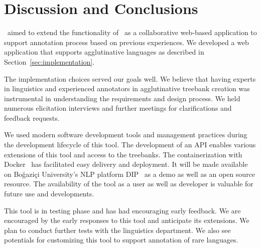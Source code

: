 \section{Discussion and Conclusions}
\label{sec:discussion}

\boatvtwo\ aimed to  extend the functionality of \boatvone\ as a collaborative web-based application to support annotation process based on previous experiences. 
We developed a web application that supports agglutinative languages as described in Section~\ref{sec:implementation}. 

The implementation choices served our goals well. 
We believe that having experts in linguistics and experienced annotators in agglutinative treebank creation was instrumental in understanding the requirements and design process. 
We held numerous elicitation interviews and further meetings for clarifications and feedback requests.

We used modern software development tools and management practices during the development lifecycle of this tool.
The development of an API enables various extensions of this tool and access to the treebanks.  
The containerization with Docker~\cite{docker} has facilitated easy delivery and deployment.
It will be made available on Boğaziçi University's NLP platform DIP~\cite{DIP} as a demo as well as an open source resource.
The availability of the tool as a user as well as developer is valuable for future use and developments. 


This tool is in testing phase and has had encouraging early feedback.
We are encouraged by the early responses to this tool and anticipate its extensions.
We plan to conduct further tests with the linguistics department. 
We also see potentials for customizing this tool to support annotation of rare languages.
